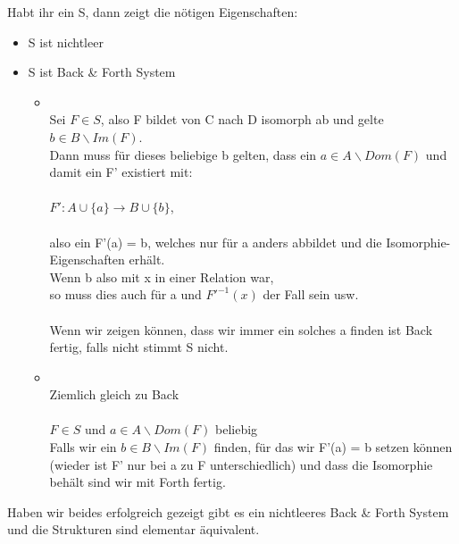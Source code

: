 \documentclass[a4paper]{scrartcl}
\begin{document}
    Habt ihr ein S, dann zeigt die nötigen Eigenschaften:\\
    \begin{itemize}
        \item S ist nichtleer\\
        \item S ist Back \& Forth System\\
            \begin{itemize}
                \item {}\\
                    Sei $F \in S$, also F bildet von C nach D isomorph ab und gelte $b \in B\backslash Im(F)$.\\
                    Dann muss für dieses beliebige b gelten, dass ein $a \in A\backslash Dom(F)$ und damit ein F' existiert mit:\\
                    \\$F': A\cup \{a\} \rightarrow B \cup \{b\} $,\\
                    \\also ein F'(a) = b, welches nur für a anders abbildet und die Isomorphie-\\Eigenschaften erhält.\\
                    Wenn b also mit x in einer Relation war,\\
                    so muss dies auch für a und $F'^{-1}(x)$ der Fall sein usw.\\
                    \\Wenn wir zeigen können, dass wir immer ein solches a finden ist Back fertig, falls nicht stimmt S nicht.\\
                
                \item {}\\
                    Ziemlich gleich zu Back\\
                    \\$F \in S$ und $a \in A\backslash Dom(F)$ beliebig\\
                    Falls wir ein $b \in B\backslash Im(F)$ finden, für das wir F'(a) = b setzen können\\
                    (wieder ist F' nur bei a zu F unterschiedlich) und dass die Isomorphie behält sind wir mit Forth fertig.\\

            \end{itemize}

    \end{itemize}

    Haben wir beides erfolgreich gezeigt gibt es ein nichtleeres Back \& Forth System und die Strukturen sind elementar äquivalent.\\
\end{document}
